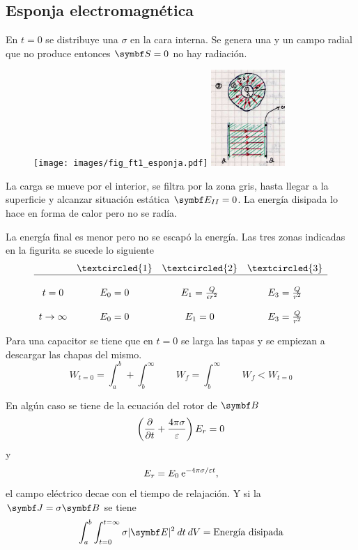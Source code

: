 \documentclass[10pt,oneside]{CBFT_book}
\begin{document}
\subsection{Esponja electromagnética}

En $t=0$ se distribuye una $\sigma$ en la cara interna. Se genera una  y un campo  
radial que no produce  entonces $\vb{S}=0$ no hay radiación.


\begin{figure}[htb]
	\begin{center}
	\texttt{[image: images/fig\_ft1\_esponja.pdf]} 
	\includegraphics[width=0.25\textwidth]{images/fig_ft1_esponjaJPG.jpg}
	\end{center}
	\caption{}
\end{figure} 

La carga se mueve por el interior, se filtra por la zona gris, hasta llegar a la superficie y 
alcanzar situación estática $\vb{E}_{II} = 0$.
La energía disipada lo hace en forma de calor pero no se radía.

La energía final es menor pero no se escapó la energía.
Las tres zonas indicadas en la figurita se sucede lo siguiente
\[
	\begin{array}{cccc}
	& \textcircled{1} & \textcircled{2} & \textcircled{3} \\
	\hline \\
	t=0 & E_0 = 0 & E_1 = \frac{Q}{\epsilon r^2} & E_3 =\frac{Q}{r^2} \\
	& & & \\
	t\to\infty & E_0 = 0 & E_1 = 0 & E_3 = \frac{Q}{r^2}  
	\end{array}
\]

Para una capacitor se tiene que en $t=0$ se larga las tapas y se empiezan a descargar las
chapas del mismo.
\[
	W_{t=0} = \int_a^b + \int_b^\infty \qquad 
	W_f = \int_b^\infty \qquad W_f < W_{t=0}
\]

En algún caso se tiene de la ecuación del rotor de $\vb B$
\[
	\left( \frac{\partial^{\hspace{-0.05em}} {}}{\partial {t}^{\hspace{-0.05em}}} + \frac{4\pi\sigma}{\varepsilon} \right) E_r = 0 
\]
y
\[
	E_r = E_0 \:\mathrm{e}^{- 4\pi\sigma/\varepsilon t},
\]
el campo eléctrico decae con el tiempo de relajación. Y si la $\vb J = \sigma \vb B$ se tiene
\[
	\int_a^b \int_{t=0}^{t=\infty} \sigma |\vb E|^2 \: dt \: dV = 
	\text{Energía disipada}
\]
\end{document}
